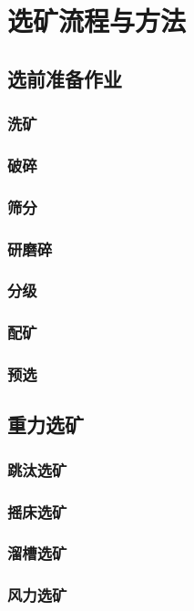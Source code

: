 \documentclass[UTF8]{../../ApplicationUniverse}
\begin{document}
\section{选矿流程与方法}
    \subsection{选前准备作业}
        \subsubsection{洗矿}
        \subsubsection{破碎}
        \subsubsection{筛分}
        \subsubsection{研磨碎}
        \subsubsection{分级}
        \subsubsection{配矿}
        \subsubsection{预选}
    \subsection{重力选矿}
        \subsubsection{跳汰选矿}
        \subsubsection{摇床选矿}
        \subsubsection{溜槽选矿}
        \subsubsection{风力选矿}
\end{document}
